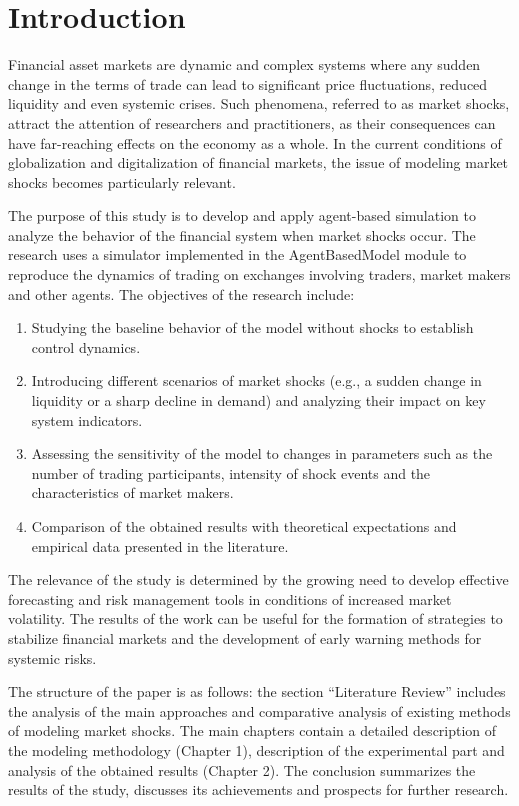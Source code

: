 \section{Introduction}

Financial asset markets are dynamic and complex systems where any sudden change in the terms of trade can lead to significant price fluctuations, reduced liquidity and even systemic crises.
Such phenomena, referred to as market shocks, attract the attention of researchers and practitioners, as their consequences can have far-reaching effects on the economy as a whole.
In the current conditions of globalization and digitalization of financial markets, the issue of modeling market shocks becomes particularly relevant.

The purpose of this study is to develop and apply agent-based simulation to analyze the behavior of the financial system when market shocks occur.
The research uses a simulator implemented in the AgentBasedModel module to reproduce the dynamics of trading on exchanges involving traders, market makers and other agents.
The objectives of the research include:

\begin{enumerate}
    \item Studying the baseline behavior of the model without shocks to establish control dynamics.
    \item Introducing different scenarios of market shocks (e.g., a sudden change in liquidity or a sharp decline in demand) and analyzing their impact on key system indicators.
    \item Assessing the sensitivity of the model to changes in parameters such as the number of trading participants, intensity of shock events and the characteristics of market makers.
    \item Comparison of the obtained results with theoretical expectations and empirical data presented in the literature.
\end{enumerate}

The relevance of the study is determined by the growing need to develop effective forecasting and risk management tools in conditions of increased market volatility.
The results of the work can be useful for the formation of strategies to stabilize financial markets and the development of early warning methods for systemic risks.

The structure of the paper is as follows: the section “Literature Review” includes the analysis of the main approaches and comparative analysis of existing methods of modeling market shocks.
The main chapters contain a detailed description of the modeling methodology (Chapter 1), description of the experimental part and analysis of the obtained results (Chapter 2).
The conclusion summarizes the results of the study, discusses its achievements and prospects for further research.